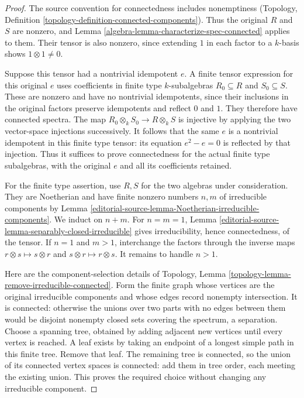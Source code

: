\begin{proof}
The source convention for connectedness
includes nonemptiness (Topology,
Definition \ref{topology-definition-connected-components}).
Thus the original $R$ and $S$ are
nonzero, and Lemma
\ref{algebra-lemma-characterize-spec-connected}
applies to them. Their tensor is
also nonzero, since extending $1$
in each factor to a $k$-basis
shows $1\otimes1\neq0$.

Suppose this tensor had a nontrivial
idempotent $e$. A finite tensor
expression for this original $e$
uses coefficients in finite type
$k$-subalgebras $R_0\subseteq R$
and $S_0\subseteq S$. These are
nonzero and have no nontrivial
idempotents, since their inclusions
in the original factors preserve
idempotents and reflect $0$ and $1$.
They therefore have connected spectra.
The map $R_0\otimes_k S_0\to R\otimes_k S$
is injective by applying the two
vector-space injections successively.
It follows that the same $e$ is
a nontrivial idempotent in this
finite type tensor: its equation
$e^2-e=0$ is reflected by that
injection. Thus it suffices to
prove connectedness for the actual
finite type subalgebras, with
the original $e$ and all its
coefficients retained.

For the finite type assertion,
use $R,S$ for the two algebras
under consideration. They are
Noetherian and have finite
nonzero numbers $n,m$ of
irreducible components by Lemma
\ref{editorial-source-lemma-Noetherian-irreducible-components}.
We induct on $n+m$. For $n=m=1$,
Lemma \ref{editorial-source-lemma-separably-closed-irreducible}
gives irreducibility, hence
connectedness, of the tensor.
If $n=1$ and $m>1$, interchange
the factors through the inverse
maps $r\otimes s\mapsto s\otimes r$
and $s\otimes r\mapsto r\otimes s$.
It remains to handle $n>1$.

Here are the component-selection
details of Topology, Lemma
\ref{topology-lemma-remove-irreducible-connected}.
Form the finite graph whose
vertices are the original
irreducible components and whose
edges record nonempty intersection.
It is connected: otherwise the
unions over two parts with no
edges between them would be
disjoint nonempty closed sets
covering the spectrum, a separation.
Choose a spanning tree, obtained
by adding adjacent new vertices
until every vertex is reached.
A leaf exists by taking an
endpoint of a longest simple
path in this finite tree.
Remove that leaf. The remaining
tree is connected, so the union
of its connected vertex spaces
is connected: add them in tree
order, each meeting the existing
union. This proves the required
choice without changing any
irreducible component.


\end{proof}
